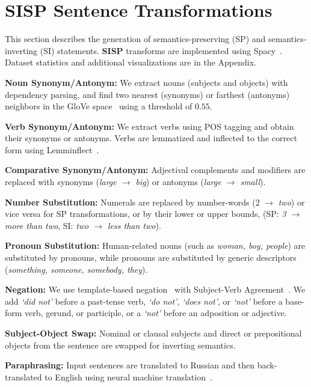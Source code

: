 \section{SISP Sentence Transformations}
This section describes the generation of semantics-preserving (SP) and semantics-inverting (SI) statements.
\textbf{SISP} transforms are implemented using Spacy~\citep{spacy}.
Dataset statistics and additional visualizations are in the Appendix.

\noindent \textbf{Noun Synonym/Antonym:}
We extract nouns (subjects and objects) with dependency parsing, and find two nearest (synonyms) or farthest (antonyms) neighbors in the GloVe space~\citep{pennington2014glove} using a threshold of $0.55$.

\noindent \textbf{Verb Synonym/Antonym:}
We extract verbs using POS tagging and obtain their synonyms or antonyms.
Verbs are lemmatized and inflected to the correct form using Lemminflect~\citep{lemminflect}.

\noindent \textbf{Comparative Synonym/Antonym:}
Adjectival complements and modifiers are replaced with synonyms (\textit{large $\rightarrow$ big}) or antonyms (\textit{large $\rightarrow$ small}). 

\noindent \textbf{Number Substitution:}
Numerals are replaced by number-words (2 $\rightarrow$ \textit{two}) or vice versa for SP transformations, or by their lower or upper bounds,
(SP: \textit{3 $\rightarrow$ more than two}, SI: \textit{two $\rightarrow$ less than two}).

\noindent \textbf{Pronoun Substitution:}
Human-related nouns (such as \textit{woman, boy, people}) are substituted by pronouns, while pronouns are substituted by generic descriptors (\textit{something, someone, somebody, they}).

\noindent \textbf{Negation:}
We use template-based negation~\citep{gokhale2020vqa} with Subject-Verb Agreement~\citep{wren2000english}.
We add \textit{`did not'} before a past-tense verb, \textit{`do not'}, \textit{`does not'}, or \textit{`not'} before a base-form verb, gerund, or participle, or a \textit{`not'} before an adposition or adjective.

\noindent \textbf{Subject-Object Swap:}
Nominal or clausal subjects and direct or prepositional objects from the sentence are swapped for inverting semantics.

\noindent \textbf{Paraphrasing:}
Input sentences are translated to Russian and then back-translated to English using neural machine translation~\citep{ott2019fairseq}.

